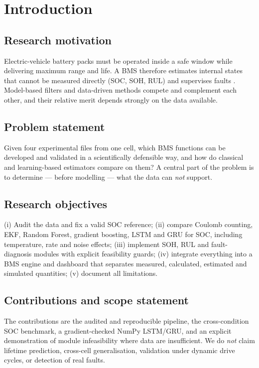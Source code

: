 \section{Introduction}
\subsection{Research motivation}
Electric-vehicle battery packs must be operated inside a safe window while delivering maximum range and life. A BMS therefore estimates internal states that cannot be measured directly (SOC, SOH, RUL) and supervises faults \cite{waag2014}. Model-based filters \cite{plett2004ekf1,plett2004ekf2,plett2004ekf3} and data-driven methods \cite{chemali2018,ng2020} compete and complement each other, and their relative merit depends strongly on the data available.

\subsection{Problem statement}
Given four experimental files from one cell, which BMS functions can be developed and validated in a scientifically defensible way, and how do classical and learning-based estimators compare on them? A central part of the problem is to determine --- before modelling --- what the data can \emph{not} support.

\subsection{Research objectives}
(i) Audit the data and fix a valid SOC reference; (ii) compare Coulomb counting, EKF, Random Forest, gradient boosting, LSTM and GRU for SOC, including temperature, rate and noise effects; (iii) implement SOH, RUL and fault-diagnosis modules with explicit feasibility guards; (iv) integrate everything into a BMS engine and dashboard that separates measured, calculated, estimated and simulated quantities; (v) document all limitations.

\subsection{Contributions and scope statement}
The contributions are the audited and reproducible pipeline, the cross-condition SOC benchmark, a gradient-checked NumPy LSTM/GRU, and an explicit demonstration of module infeasibility where data are insufficient. We do \emph{not} claim lifetime prediction, cross-cell generalisation, validation under dynamic drive cycles, or detection of real faults.
